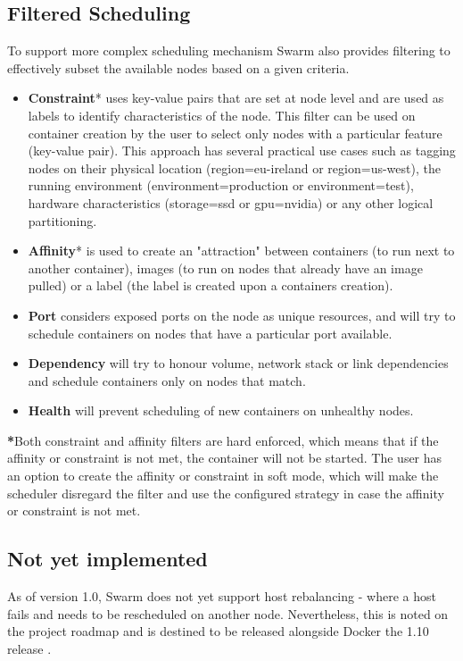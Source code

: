 \documentclass{article}
\begin{document}
\subsection{Filtered Scheduling}
To support more complex scheduling mechanism Swarm also provides filtering to effectively subset the available nodes based on a given criteria.
\begin{itemize}
\item \textbf{Constraint}* uses key-value pairs that are set at node level and are used as labels to identify characteristics of the node. This filter can be used on container creation by the user to select only nodes with a particular feature (key-value pair). This approach has several practical use cases such as tagging nodes on their physical location (region=eu-ireland or region=us-west), the running environment (environment=production or environment=test), hardware characteristics (storage=ssd or gpu=nvidia) or any other logical partitioning.
\item \textbf{Affinity}* is used to create an "attraction" between containers (to run next to another container), images (to run on nodes that already have an image pulled) or a label (the label is created upon a containers creation).
\item \textbf{Port} considers exposed ports on the node as unique resources, and will try to schedule containers on nodes that have a particular port available.
\item \textbf{Dependency} will try to honour volume, network stack or link dependencies and schedule containers only on nodes that match.
\item \textbf{Health} will prevent scheduling of new containers on unhealthy nodes.
\end{itemize}
\textbf{*}Both constraint and affinity filters are hard enforced, which means that if the affinity or constraint is not met, the container will not be started. The user has an option to create the affinity or constraint in soft mode, which will make the scheduler disregard the filter and use the configured strategy in case the affinity or constraint is not met.
\subsection{Not yet implemented}
As of version 1.0, Swarm does not yet support host rebalancing - where a host fails and needs to be rescheduled on another node. Nevertheless, this is noted on the project roadmap and is destined to be released alongside Docker the 1.10 release \citep{Vieux}.
\end{document}
